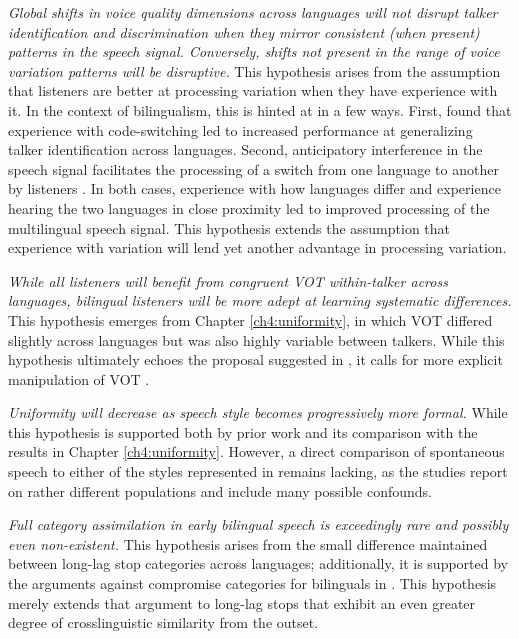 \textit{Global shifts in voice quality dimensions across languages will not disrupt talker identification and discrimination when they mirror consistent (when present) patterns in the speech signal. Conversely, shifts not present in the range of voice variation patterns will be disruptive.} This hypothesis arises from the assumption that listeners are better at processing variation when they have experience with it. In the context of bilingualism, this is hinted at in a few ways. First, \citet{orena_2019_identifying} found that experience with code-switching led to increased performance at generalizing talker identification across languages. Second, anticipatory interference in the speech signal facilitates the processing of a switch from one language to another by listeners \citep{fricke_2016_phonetic}. In both cases, experience with how languages differ and experience hearing the two languages in close proximity led to improved processing of the multilingual speech signal. This hypothesis extends the assumption that experience with variation will lend yet another advantage in processing variation. 

\textit{While all listeners will benefit from congruent VOT within-talker across languages, bilingual listeners will be more adept at learning systematic differences.} This hypothesis emerges from Chapter \ref{ch4:uniformity}, in which VOT differed slightly across languages but was also highly variable between talkers. While this hypothesis ultimately echoes the proposal suggested in \citet{orena_2019_identifying}, it calls for more explicit manipulation of VOT \citep[e.g., as in the experimental study in][]{fricke_2016_phonetic}.

\textit{Uniformity will decrease as speech style becomes progressively more formal.} While this hypothesis is supported both by prior work \citep{chodroff_2017_structure} and its comparison with the results in Chapter \ref{ch4:uniformity}. However, a direct comparison of spontaneous speech to either of the styles represented in \citet{chodroff_2017_structure} remains lacking, as the studies report on rather different populations and include many possible confounds. 

\textit{Full category assimilation in early bilingual speech is exceedingly rare and possibly even non-existent.} This hypothesis arises from the small difference maintained between long-lag stop categories across languages; additionally, it is supported by the arguments against compromise categories for bilinguals in \citet{casillas_2021_interlingual}. This hypothesis merely extends that argument to long-lag stops that exhibit an even greater degree of crosslinguistic similarity from the outset.  

